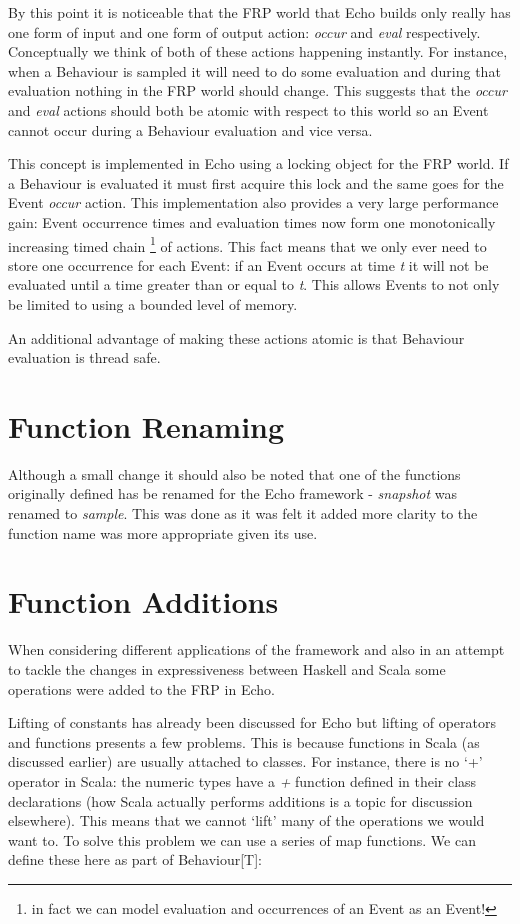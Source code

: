    By this point it is noticeable that the FRP world that Echo builds only really has one form of input and one
   form of output action: \emph{occur} and \emph{eval} respectively. Conceptually we think of both of these
   actions happening instantly. For instance, when a Behaviour is sampled it will need to do some evaluation
   and during that evaluation nothing in the FRP world should change. This suggests that the \emph{occur}
   and \emph{eval} actions should both be atomic with respect to this world so an Event cannot occur during
   a Behaviour evaluation and vice versa. 
   
   This concept is implemented in Echo using a locking object for the FRP world. If a Behaviour is evaluated it
   must first acquire this lock and the same goes for the Event \emph{occur} action. This implementation
   also provides a very large performance gain: Event occurrence times and evaluation times now form one
   monotonically increasing timed chain \footnote{in fact we can model evaluation and occurrences of an Event as an Event!} 
   of actions. This fact means that we only ever need to store one occurrence for each Event: if an Event occurs
   at time \emph{t} it will not be evaluated until a time greater than or equal to \emph{t}. This allows
   Events to not only be limited to using a bounded level of memory.
   
   An additional advantage of making these actions atomic is that Behaviour evaluation is thread safe.
  
  \section{Function Renaming}
    Although a small change it should also be noted that one of the functions originally defined
    has be renamed for the Echo framework - \emph{snapshot} was renamed to \emph{sample}. This was done as
    it was felt it added more clarity to the function name was more appropriate given its use.
    
  \section{Function Additions}
    When considering different applications of the framework and also in an attempt to
    tackle the changes in expressiveness between Haskell and Scala some operations
    were added to the FRP in Echo.
    
    Lifting of constants has already been discussed for Echo but lifting of operators and
    functions presents a few problems. This is because functions in Scala (as discussed earlier)
    are usually attached to classes. For instance, there is no `+' operator in Scala: the numeric
    types have a \emph{+} function defined in their class declarations (how Scala actually performs additions
    is a topic for discussion elsewhere). This means that we cannot `lift' many of the operations we
    would want to. To solve this problem we can use a series of map functions. We can define these
    here as part of Behaviour[T]:

